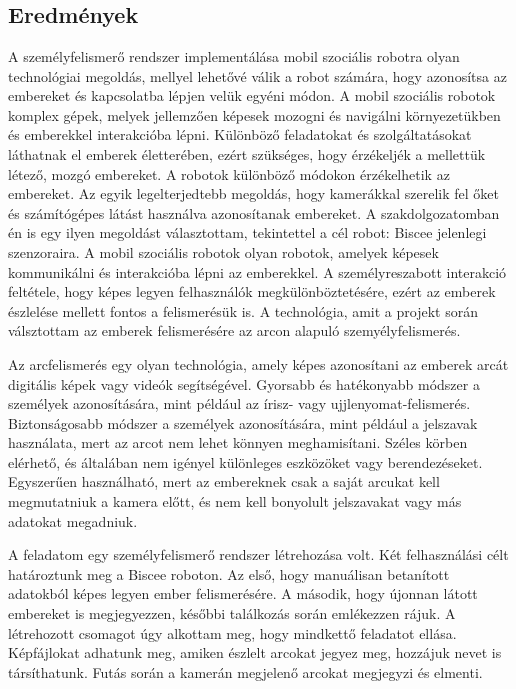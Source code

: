\chapter{\osszefoglalas} %


\section{Eredmények}
A személyfelismerő rendszer implementálása mobil szociális robotra olyan technológiai megoldás, mellyel lehetővé válik a robot számára, hogy azonosítsa az embereket és kapcsolatba lépjen velük egyéni módon. A mobil szociális robotok komplex gépek, melyek jellemzően képesek mozogni és navigálni környezetükben és emberekkel interakcióba lépni. Különböző feladatokat és szolgáltatásokat láthatnak el emberek életterében, ezért szükséges, hogy érzékeljék a mellettük létező, mozgó embereket. A robotok különböző módokon érzékelhetik az embereket. Az egyik legelterjedtebb megoldás, hogy kamerákkal szerelik fel őket és számítógépes látást használva azonosítanak embereket. A szakdolgozatomban én is egy ilyen megoldást választottam, tekintettel a cél robot: Biscee jelenlegi szenzoraira. A mobil szociális robotok olyan robotok, amelyek képesek kommunikálni és interakcióba lépni az emberekkel. A személyreszabott interakció feltétele, hogy képes legyen felhasználók megkülönböztetésére, ezért az emberek észlelése mellett fontos a felismerésük is. A technológia, amit a projekt során válsztottam az emberek felismerésére az arcon alapuló szemyélyfelismerés.

Az arcfelismerés egy olyan technológia, amely képes azonosítani az emberek arcát digitális képek vagy videók segítségével. Gyorsabb és hatékonyabb módszer a személyek azonosítására, mint például az írisz- vagy ujjlenyomat-felismerés. Biztonságosabb módszer a személyek azonosítására, mint például a jelszavak használata, mert az arcot nem lehet könnyen meghamisítani. Széles körben elérhető, és általában nem igényel különleges eszközöket vagy berendezéseket. Egyszerűen használható, mert az embereknek csak a saját arcukat kell megmutatniuk a kamera előtt, és nem kell bonyolult jelszavakat vagy más adatokat megadniuk.

A feladatom egy személyfelismerő rendszer létrehozása volt. Két felhasználási célt határoztunk meg a Biscee roboton. Az első, hogy manuálisan betanított adatokból képes legyen ember felismerésére. A második, hogy újonnan látott embereket is megjegyezzen, későbbi találkozás során emlékezzen rájuk. A létrehozott csomagot úgy alkottam meg, hogy mindkettő feladatot ellása. Képfájlokat adhatunk meg, amiken észlelt arcokat jegyez meg, hozzájuk nevet is társíthatunk. Futás során a kamerán megjelenő arcokat megjegyzi és elmenti. 

